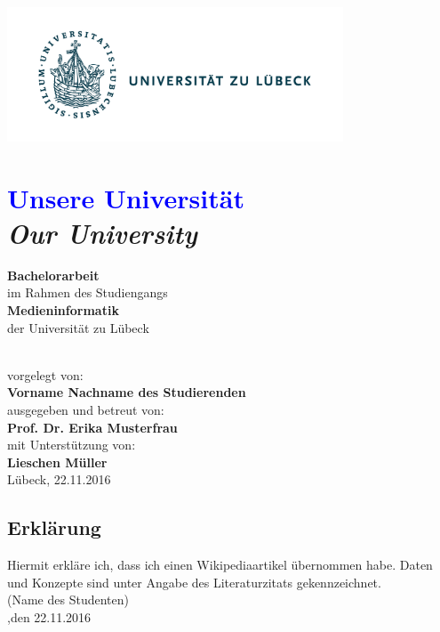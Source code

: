 \documentclass[a4paper]{article}
\author{Kira von Horsten, Doreen Schwarze}
\begin{document}
\thispagestyle{empty}
\begin{center}
\includegraphics[width=10cm]{Uni}
\section*{\textcolor{blue}{\textbf{Unsere Universität}}\\\textit{Our University }}
\vspace{1cm}
\begin{small}
\textbf{Bachelorarbeit}\\ 
\vspace{1cm }
im Rahmen des Studiengangs\\
\textbf{Medieninformatik}\\
der Universität zu Lübeck
\end{small}
\vspace{1.5cm}\\ vorgelegt von:\\ \textbf{Vorname Nachname des Studierenden}
\vspace{1.5cm}\\ ausgegeben und betreut von:\\ \textbf{Prof. Dr. Erika Musterfrau}
\vspace{1.5cm}\\ mit Unterstützung von:\\ \textbf{Lieschen Müller}\\

\vspace{1cm}Lübeck, 22.11.2016
\end{center}
\newpage 
\thispagestyle{empty}
\quad 
\newpage
{}
\setcounter{page}{3}
\vspace*{\fill}
\subsection*{Erklärung}
Hiermit erkläre ich, dass ich einen Wikipediaartikel übernommen habe. Daten und Konzepte sind unter Angabe des Literaturzitats gekennzeichnet.\\
\newline
\newline
\newline
\underline{\hspace{7 cm}}
\newline
(Name des Studenten)\\,den 22.11.2016
\end{document}
